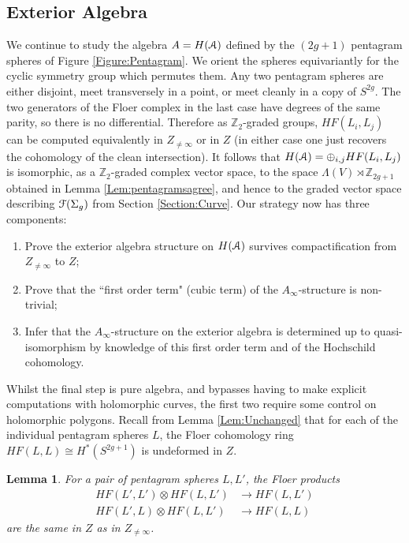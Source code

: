 \documentclass[reqno,10pt]{amsart}
\numberwithin{equation}{section}
\newcommand{\bZ}{{\mathbb Z}}
\newcommand{\scrF}{\EuScript{F}}
\newcommand{\scrA}{\EuScript{A}}
\newtheorem{Lemma}[thm]{Lemma}
\theoremstyle{remark}
\begin{document}

\subsection{Exterior Algebra\label{Section:Exterior}}

We continue to study the algebra $A = H(\scrA)$ defined by the $(2g+1)$ pentagram spheres of Figure \ref{Figure:Pentagram}.  We orient the spheres equivariantly for the cyclic symmetry group which permutes them.  Any two pentagram spheres are either disjoint, meet transversely in a point, or meet cleanly in a copy of $S^{2g}$. The two generators of the Floer complex in the last case have degrees of the same parity, so there is no differential. Therefore as $\bZ_2$-graded groups, $HF(L_i, L_j)$ can be computed equivalently in $Z_{\neq\infty}$ or in $Z$ (in either case one just recovers the cohomology of the clean intersection).   It follows that $H(\scrA) = \oplus_{i,j} HF(L_i, L_j)$ is isomorphic, as a $\bZ_2$-graded complex vector space, to the space $\Lambda(V) \rtimes \bZ_{2g+1}$  obtained in Lemma \ref{Lem:pentagramsagree}, and hence to the graded vector space describing $\scrF(\Sigma_g)$ from Section \ref{Section:Curve}.   Our strategy now has three components:
\begin{enumerate}
\item Prove the exterior algebra structure on $H(\scrA)$ survives compactification from $Z_{\neq\infty}$ to $Z$;
\item Prove that the ``first order term" (cubic term) of the $A_{\infty}$-structure is non-trivial;
\item Infer that the $A_{\infty}$-structure on the exterior algebra is determined up to quasi-isomorphism by knowledge of this first order term and of the Hochschild cohomology.
\end{enumerate}
Whilst the final step is pure algebra, and bypasses having to make explicit computations with holomorphic curves, the first two require some control on holomorphic polygons.  Recall from Lemma \ref{Lem:Unchanged} that for each of the individual pentagram spheres $L$, the Floer cohomology ring $HF(L,L) \cong H^*(S^{2g+1})$ is undeformed in $Z$. 

\begin{Lemma} \label{Lem:TwoSpheresOK}
For a pair of pentagram spheres $L, L'$, the Floer products
\begin{equation}
\begin{aligned}
HF(L', L') \otimes HF(L,L') & \longrightarrow HF(L,L') \\
HF(L', L) \otimes HF(L,L') & \longrightarrow HF(L,L)
\end{aligned}
\end{equation}
are the same in $Z$ as in $Z_{\neq\infty}$.
\end{Lemma}
\end{document}
